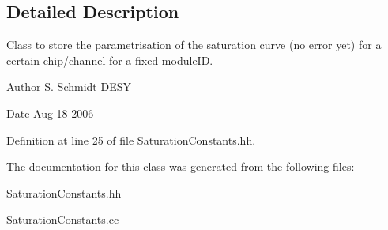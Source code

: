 \subsection{Detailed Description}
Class to store the parametrisation of the saturation curve (no error yet) for a certain chip/channel for a fixed moduleID. \begin{DoxyAuthor}{Author}
S. Schmidt DESY 
\end{DoxyAuthor}
\begin{DoxyDate}{Date}
Aug 18 2006 
\end{DoxyDate}


Definition at line 25 of file SaturationConstants.hh.

The documentation for this class was generated from the following files:\begin{DoxyCompactItemize}
\item 
SaturationConstants.hh\item 
SaturationConstants.cc\end{DoxyCompactItemize}

